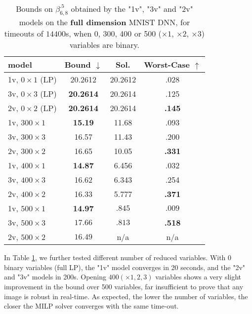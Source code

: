 	\begin{table}[h!]
		\centering
	\begin{tabular}{||l||c|c|c||}\hline\hline
		model &        Bound $\downarrow$ &  Sol. &      Worst-Case $\uparrow$ \\\hline \hline
		1v, $0 \times 1$ (LP) & 20.2612  & 20.2612  & .028 \\\hline 
		3v, $0 \times 3$ (LP) & {\bf 20.2614}  & 20.2614  & .125 \\\hline 
	    2v, $0 \times 2$ (LP) & {\bf 20.2614}  & 20.2614  & {\bf .145} \\\hline\hline	 


		1v, $300 \times 1$ & {\bf 15.19} & 11.68 & .093 \\\hline 
		3v, $300 \times 3$ & 16.57 & 11.43 & .200 \\\hline 
	    2v, $300 \times 2$ & 16.65 & 10.05 & {\bf .331} \\\hline\hline	 

		1v, $400 \times 1$ & {\bf 14.87} & 6.456 & .032 \\\hline 
		3v, $400 \times 3$ & 16.62 & 6.343 & .254 \\\hline 
	    2v, $400 \times 2$ & 16.33 & 5.777 & {\bf .371} \\\hline \hline

		1v, $500 \times 1$ & {\bf 14.97} & $.845$ & $.009$ \\\hline 
		3v, $500 \times 3$ & $17.66$ & $.813$ & {\bf .518} \\\hline 
	    2v, $500 \times 2$ & $16.49$ & n/a & n/a \\\hline\hline	 
	\end{tabular}
	\caption{Bounds on $\beta^{.5}_{6,8}$ 
	obtained by the "1v", "3v" and "2v" models 
	on the {\bf full dimension} MNIST DNN, 
	for timeouts of $14400$s, when 0, 300, 400 or 500 ($\times 1$, $\times 2$, $\times 3$) variables are binary.}
	\label{table.mnist}
\end{table}

In Table \ref{table.mnist}, we further tested different number of reduced variables. 
With 0 binary variables (full LP), the "1v" model converges in 20 seconds, and the "2v" and "3v" models in 200s.
Opening $400 (\times 1,2,3)$ variables shows a very slight improvement in the bound over 500 variables, 
far insufficient to prove that any image is robust in real-time. As expected, the lower the number of variables, the closer the MILP solver converges with the same time-out.




